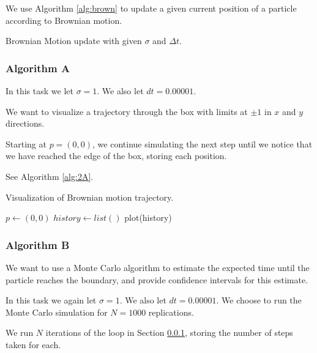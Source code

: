 We use Algorithm \ref{alg:brown} to update a given current position of a particle according to Brownian motion.

\begin{algorithm}[H]
    \label{alg:brown}
    \caption{Brownian Motion update with given $\sigma$ and $\Delta t$.}
\end{algorithm}

\subsubsection{Algorithm A}
\label{sec:alg2A}

In this task we let $\sigma = 1$.  We also let $dt = 0.00001$.

We want to visualize a trajectory through the box with limits at $\pm 1$ in $x$ and $y$ directions. 

Starting at $p = (0,0)$, we continue simulating the next step until we notice that we have reached the edge of the box, storing each position. 

See Algorithm \ref{alg:2A}.

\begin{algorithm}[H]
    \label{alg:2A}
    \caption{Visualization of Brownian motion trajectory.}
    $p \gets (0,0)$ \;
    $history \gets list()$ 
    plot(history) 
\end{algorithm}


\subsubsection{Algorithm B}
\label{sec:alg2B}

We want to use a Monte Carlo algorithm to estimate the expected time until the particle reaches the boundary, and provide confidence intervals for this estimate.

In this task we again let $\sigma = 1$.  We also let $dt = 0.00001$. We choose to run the Monte Carlo simulation for $N = 1000$ replications.

We run $N$ iterations of the loop in Section \ref{sec:alg2A}, storing the number of steps taken for each.

